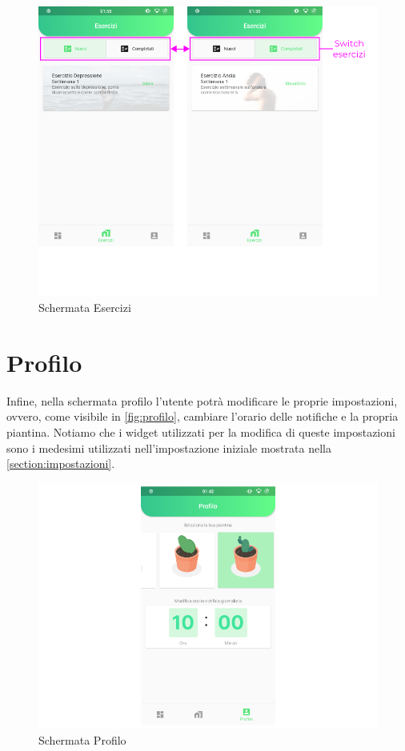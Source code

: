 \begin{figure}[h!]
\centering
\includegraphics[width=\textwidth]{img/schermata_esercizi}
\caption{Schermata Esercizi}
\label{fig:schermata_esercizi}
\end{figure}

\newpage
\section{Profilo}
Infine, nella schermata profilo l'utente potrà modificare le proprie impostazioni, ovvero, come visibile in \autoref{fig:profilo}, cambiare l'orario delle notifiche e la propria piantina. Notiamo che i widget utilizzati per la modifica di queste impostazioni sono i medesimi utilizzati nell'impostazione iniziale mostrata nella \autoref{section:impostazioni}.

\begin{figure}[h!]
\centering
\includegraphics[width=\textwidth]{img/profilo}
\caption{Schermata Profilo}
\label{fig:profilo}
\end{figure}